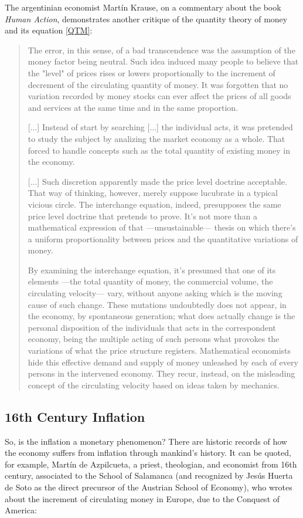 \documentclass[12pt,a4paper,twoside]{book}
\begin{document}
The argentinian economist Martín Krause, on a commentary about the book \textit{Human Action}, demonstrates another critique of the quantity theory of money and its equation \eqref{QTM}:

\begin{quotation}
The error, in this sense, of a bad transcendence was the assumption of the money factor being neutral. Such idea induced many people to believe that the "level" of prices rises or lowers proportionally to the increment of decrement of the circulating quantity of money. It was forgotten that no variation recorded by money stocks can ever affect the prices of all goods and services at the same time and in the same proportion. 

[...] Instead of start by searching [...] the individual acts, it was pretended to study the subject by analizing the market economy as a whole. That forced to handle concepts such as the total quantity of existing money in the economy.

[...] Such discretion apparently made the price level doctrine acceptable. That way of thinking, however, merely suppose lucubrate in a typical vicious circle. The interchange equation, indeed, presupposes the same price level doctrine that pretends to prove. It's not more than a mathematical expression of that —unsustainable— thesis on which there's a uniform proportionality between prices and the quantitative variations of money.

By examining the interchange equation, it's presumed that one of its elements —the total quantity of money, the commercial volume, the circulating velocity— vary, without anyone asking which is the moving cause of such change. These mutations undoubtedly does not appear, in the economy, by spontaneous generation; what does actually change is the personal disposition of the individuals that acts in the correspondent economy, being the multiple acting of such persons what provokes the variations of what the price structure registers. Mathematical economists hide this effective demand and supply of money unleashed by each of every persons in the intervened economy. They recur, instead, on the misleading concept of the circulating velocity based on ideas taken by mechanics. \cite{krause:teomon}
\end{quotation}

\subsection{16th Century Inflation}
So, is the inflation a monetary phenomenon? There are historic records of how the economy suffers from inflation through mankind's history. It can be quoted, for example, Martín de Azpilcueta, a priest, theologian, and economist from 16th century, associated to the School of Salamanca (and recognized by Jesús Huerta de Soto as the direct precursor of the Austrian School of Economy), who wrotes about the increment of circulating money in Europe, due to the Conquest of America:
\end{document}

